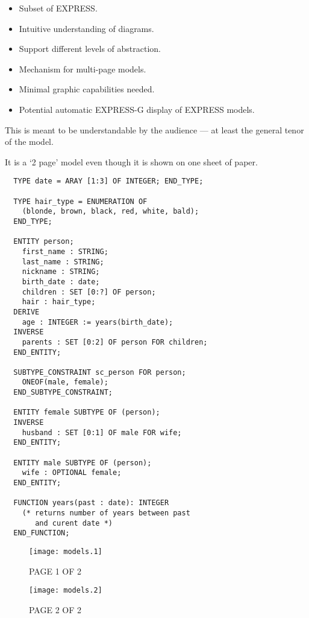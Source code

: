 
\begin{itemize}
\item Subset of EXPRESS.
\item Intuitive understanding of diagrams.
\item Support different levels of abstraction.
\item Mechanism for multi-page models.
\item Minimal graphic capabilities needed.
\item Potential automatic EXPRESS-G display of EXPRESS models.
\end{itemize}


\begin{remarks}
\remintro
{}

This is meant to be understandable by the audience --- at least the general
tenor of the model.

    It is a `2 page' model even though it is shown on one sheet of paper.

\normalsize
\begin{verbatim}
  TYPE date = ARAY [1:3] OF INTEGER; END_TYPE;

  TYPE hair_type = ENUMERATION OF
    (blonde, brown, black, red, white, bald);
  END_TYPE;

  ENTITY person;
    first_name : STRING;
    last_name : STRING;
    nickname : STRING;
    birth_date : date;
    children : SET [0:?] OF person;
    hair : hair_type;
  DERIVE
    age : INTEGER := years(birth_date);
  INVERSE
    parents : SET [0:2] OF person FOR children;
  END_ENTITY;

  SUBTYPE_CONSTRAINT sc_person FOR person;
    ONEOF(male, female);
  END_SUBTYPE_CONSTRAINT;

  ENTITY female SUBTYPE OF (person);
  INVERSE
    husband : SET [0:1] OF male FOR wife;
  END_ENTITY;

  ENTITY male SUBTYPE OF (person);
    wife : OPTIONAL female;
  END_ENTITY;

  FUNCTION years(past : date): INTEGER
    (* returns number of years between past
       and curent date *)
  END_FUNCTION;
\end{verbatim}

\remend
\end{remarks}


\begin{figure}[hp]
\normalsize
\centering
\texttt{[image: models.1]}

\vspace{\afttit}

PAGE 1 OF 2

\vspace{\afttit}
\vspace{\afttit}

\texttt{[image: models.2]}

\vspace{\afttit}

PAGE 2 OF 2
\end{figure}

